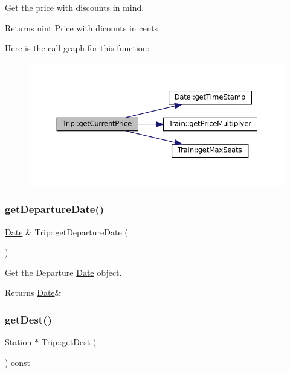 Get the price with discounts in mind. 

\begin{DoxyReturn}{Returns}
uint Price with dicounts in cents 
\end{DoxyReturn}
Here is the call graph for this function\+:
\nopagebreak
\begin{figure}[H]
\begin{center}
\leavevmode
\includegraphics[width=350pt]{classTrip_a9006732aa32a2b098538d48b63f2d276_cgraph}
\end{center}
\end{figure}
\mbox{\label{classTrip_ae7c3b34b692a17737a2b1200060fa479}} 
\subsubsection{\texorpdfstring{get\+Departure\+Date()}{getDepartureDate()}}
{\footnotesize\ttfamily \mbox{\hyperlink{classDate}{Date}} \& Trip\+::get\+Departure\+Date (\begin{DoxyParamCaption}{ }\end{DoxyParamCaption})}



Get the Departure \mbox{\hyperlink{classDate}{Date}} object. 

\begin{DoxyReturn}{Returns}
\mbox{\hyperlink{classDate}{Date}}\& 
\end{DoxyReturn}
\mbox{\label{classTrip_a459ae85fc25404ba616fabfb4b4165f4}} 
\subsubsection{\texorpdfstring{get\+Dest()}{getDest()}}
{\footnotesize\ttfamily \mbox{\hyperlink{classStation}{Station}} $\ast$ Trip\+::get\+Dest (\begin{DoxyParamCaption}{ }\end{DoxyParamCaption}) const}



